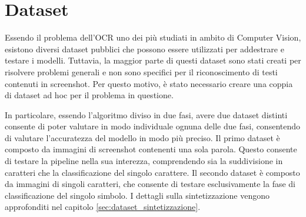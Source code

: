 \chapter{Dataset}

Essendo il problema dell'OCR uno dei più studiati in ambito di Computer Vision, esistono diversi dataset pubblici che possono essere utilizzati per addestrare e testare i modelli. Tuttavia, la maggior parte di questi dataset sono stati creati per risolvere problemi generali e non sono specifici per il riconoscimento di testi contenuti in screenshot. Per questo motivo, è stato necessario creare una coppia di dataset ad hoc per il problema in questione.

In particolare, essendo l'algoritmo diviso in due fasi, avere due dataset distinti consente di poter valutare in modo individuale ognuna delle due fasi, consentendo di valutare l'accuratezza del modello in modo più preciso.
Il primo dataset è composto da immagini di screenshot contenenti una sola parola. Questo consente di testare la pipeline nella sua interezza, comprendendo sia la suddivisione in caratteri che la classificazione del singolo carattere. Il secondo dataset è composto da immagini di singoli caratteri, che consente di testare esclusivamente la fase di classificazione del singolo simbolo. I dettagli sulla sintetizzazione vengono approfonditi nel capitolo \ref{sec:dataset_sintetizzazione}.